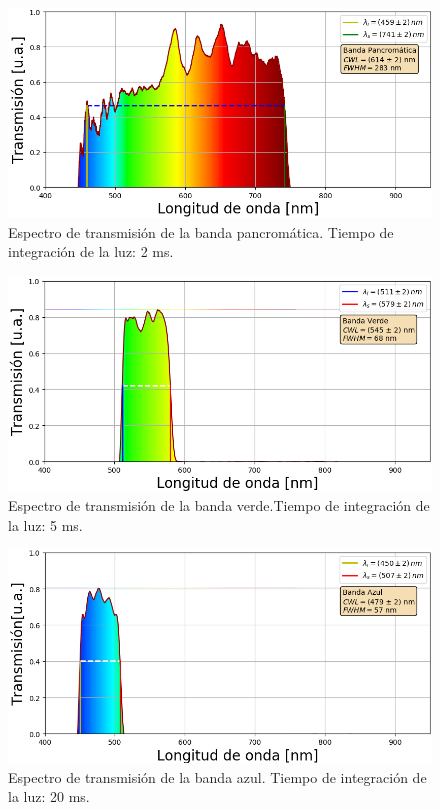 \begin{figure}[H]
	\centering
	\includegraphics[scale=0.8]{Figs/microespectrometro/espectro_pancromaticat.png}
	\caption{Espectro de transmisión de la banda pancromática. Tiempo de integración de la luz: 2 ms.}
	\label{fig:bpanc}
\end{figure}
\begin{figure}[H]
	\centering
	\includegraphics[scale=0.8]{Figs/microespectrometro/espectro_verdet.png}
	\caption{Espectro de transmisión de la banda verde.Tiempo de integración de la luz: 5 ms.}
	\label{fig:bverde}
\end{figure}
\begin{figure}[H]
	\centering
	\includegraphics[scale=0.8]{Figs/microespectrometro/espectro_azult.png}
	\caption{Espectro de transmisión de la banda azul. Tiempo de integración de la luz: 20 ms.}
	\label{fig:bazul}
\end{figure}

